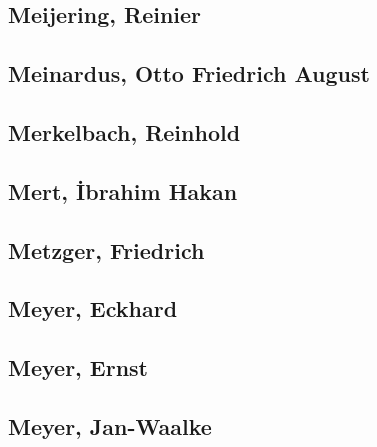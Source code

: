 \subsection[Meijering, Reinier (1)]{Meijering, Reinier}

\subsection[Meinardus, Otto Friedrich August (1)]{Meinardus, Otto Friedrich August}

\subsection[Merkelbach, Reinhold (3)]{Merkelbach, Reinhold}



\subsection[Mert, İbrahim Hakan (1)]{Mert, İbrahim Hakan}

\subsection[Metzger, Friedrich (1)]{Metzger, Friedrich}

\subsection[Meyer, Eckhard (1)]{Meyer, Eckhard}

\subsection[Meyer, Ernst (1)]{Meyer, Ernst}

\subsection[Meyer, Jan-Waalke (1)]{Meyer, Jan-Waalke}

